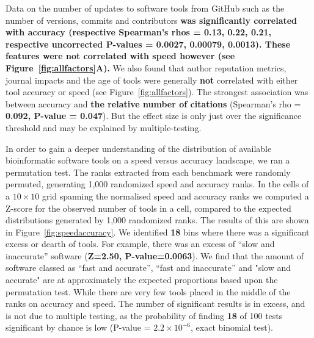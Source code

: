 \documentclass[fleqn,10pt]{SelfArx} %
\begin{document}
Data on the
number of updates to software tools from GitHub such as the number of versions,
commits and contributors \textbf{{\color{red}was significantly correlated with 
accuracy (respective Spearman’s rhos = 0.13, 0.22, 0.21, respective uncorrected P-values = 0.0027, 0.00079, 0.0013). 
These features were not correlated with speed however (see Figure~\ref{fig:allfactors}A).
}}
We also found that author reputation metrics, journal impacts and the age
of tools were generally \textbf{not} correlated with either tool
accuracy or speed (see Figure~\ref{fig:allfactors}). The strongest
association was between accuracy and \textbf{{\color{red}the relative
    number of citations}} (Spearman’s rho = \textbf{{\color{red}0.092,
    P-value = 0.047}}). But the effect size is only just over the
significance threshold and may be explained by multiple-testing. 
    

In order to gain a deeper understanding of the distribution of
available bioinformatic software tools on a speed versus accuracy
landscape, we ran a permutation test. The ranks extracted
from each benchmark were randomly permuted, generating 1,000
randomized speed and accuracy ranks. In the cells of a $10\times10$
grid spanning the normalised speed and accuracy ranks we computed a
Z-score for the observed number of tools in a cell, compared to the
expected distributions generated by 1,000 randomized ranks. The results
of this are shown in Figure~\ref{fig:speedaccuracy}. We identified \textbf{{\color{red}18}}
bins where there was a significant excess or dearth of tools. For
example, there was an excess of “slow and inaccurate” software (\textbf{{\color{red}Z=2.50,
P-value=0.0063}}). We find that the amount of software classed as “fast
and accurate”, “fast and inaccurate” and "slow and accurate" are at approximately the
expected proportions based upon the permutation test. 
While there are very few tools placed in the middle of the ranks on accuracy and speed.
The number of
significant results is in excess, and is not due to multiple testing, as
the probability of finding \textbf{{\color{red}18}} of 100 tests significant by chance is
low (P-value = \textbf{{\color{red}$2.2\times 10^{-6}$}}, exact binomial test).

\end{document}

